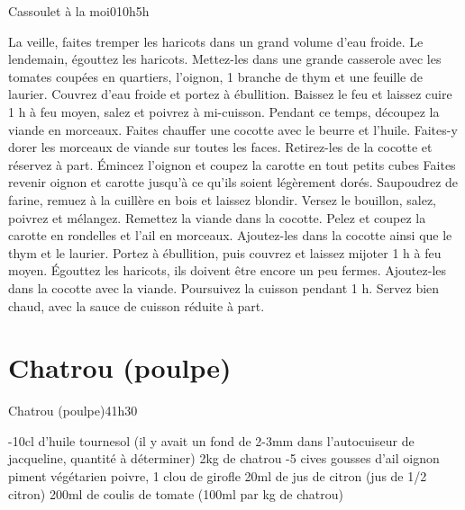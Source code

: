 {\begin{recette}{Cassoulet à la moi}{0}{10h}{5h}
\begin{preparation}
\etape La veille, faites tremper les haricots dans un grand volume d'eau froide.
\etape Le lendemain, égouttez les haricots. Mettez-les dans une grande casserole avec les tomates coupées en quartiers, 
l'oignon, 1 branche de thym et une feuille de laurier. Couvrez d'eau froide et portez à ébullition.
\etape Baissez le feu et laissez cuire 1 h à feu moyen, salez et poivrez à mi-cuisson.
\etape Pendant ce temps, découpez la viande en morceaux. Faites chauffer une cocotte avec le beurre et l'huile. Faites-y dorer 
les morceaux de viande sur toutes les faces.
\etape Retirez-les de la cocotte et réservez à part.
\etape Émincez l'oignon et coupez la carotte en tout petits cubes
\etape Faites revenir oignon et carotte jusqu'à ce qu'ils soient légèrement dorés. 
\etape Saupoudrez de farine, remuez à la cuillère en bois et laissez blondir.
\etape Versez le bouillon, salez, poivrez et mélangez. Remettez la viande dans la cocotte.
\etape Pelez et coupez la carotte en rondelles et l'ail en morceaux. Ajoutez-les dans la cocotte ainsi que le thym et le 
laurier. Portez à ébullition, puis couvrez et laissez mijoter 1 h à feu moyen.
\etape Égouttez les haricots, ils doivent être encore un peu fermes. Ajoutez-les dans la cocotte avec la viande.
\etape Poursuivez la cuisson pendant 1 h.
\etape Servez bien chaud, avec la sauce de cuisson réduite à part.
\end{preparation}
\end{recette}


\section{Chatrou (poulpe)}
\begin{recette}{Chatrou (poulpe)}{4}{1h30}{}
\begin{ingredients}
-10cl d'huile tournesol (il y avait un fond de 2-3mm dans l'autocuiseur de jacqueline, quantité à déterminer)
\ingredient 2kg de chatrou
-5 cives
 gousses d'ail
 oignon
 piment végétarien
\ingredient poivre, 1 clou de girofle
\ingredient 20ml de jus de citron (jus de 1/2 citron)
\ingredient 200ml de coulis de tomate (100ml par kg de chatrou)
\end{ingredients}


\end{recette}}
